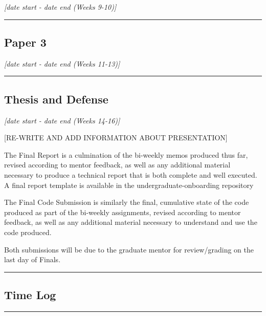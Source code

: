 \documentclass[12pt]{article}
\begin{document}
\textit{[date start - date end (Weeks 9-10)]}



\vspace{1em}\hrule\vspace{1em}
\subsection{Paper 3}
\label{ssec:p3}

\textit{[date start - date end (Weeks 11-13)]}


\vspace{1em}\hrule\vspace{1em}
\subsection{Thesis and Defense}
\label{sec:finalreport}

\textit{[date start - date end (Weeks 14-16)]}


[RE-WRITE AND ADD INFORMATION ABOUT PRESENTATION]

The Final Report is a culmination of the bi-weekly memos produced thus far, revised according to mentor feedback, as well as any additional material necessary to produce a technical report that is both complete and well executed.  A final report template is available in the undergraduate-onboarding repository

The Final Code Submission is similarly the final, cumulative state of the code produced as part of the bi-weekly assignments, revised according to mentor feedback, as well as any additional material necessary to understand and use the code produced.

Both submissions will be due to the graduate mentor for review/grading on the last day of Finals.


\vspace{1em}\hrule\vspace{1em}
\subsection{Time Log}
\label{sec:timelog}


\vspace{1em}\hrule\vspace{1em}




\end{document}
